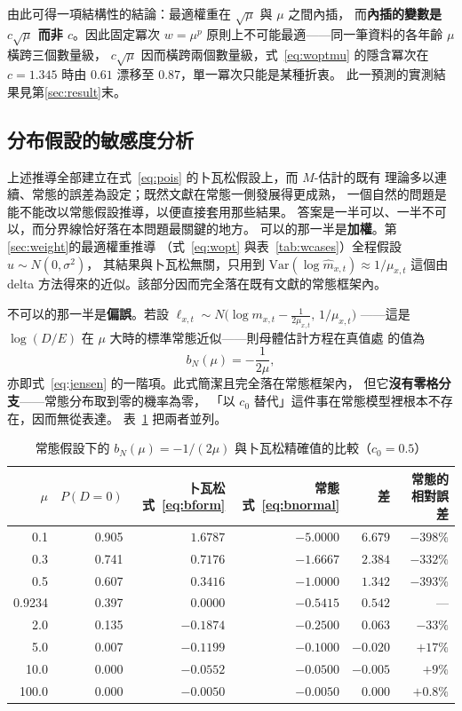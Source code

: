 \documentclass[UTF8, fontset=macnew, a4paper, 12pt]{ctexart}
\begin{document}
由此可得一項結構性的結論：最適權重在 $\sqrt{\mu}$ 與 $\mu$ 之間內插，
而\textbf{內插的變數是 $c\sqrt{\mu}$ 而非 $c$}。因此固定冪次 $w=\mu^{p}$
原則上不可能最適——同一筆資料的各年齡 $\mu$ 橫跨三個數量級，
$c\sqrt{\mu}$ 因而橫跨兩個數量級，式~\eqref{eq:woptmu} 的隱含冪次在
$c=1.345$ 時由 $0.61$ 漂移至 $0.87$，單一冪次只能是某種折衷。
此一預測的實測結果見第\ref{sec:result}末。

\subsection{分布假設的敏感度分析}\label{sec:normal}

上述推導全部建立在式~\eqref{eq:pois} 的卜瓦松假設上，而 $M$-估計的既有
理論多以連續、常態的誤差為設定；既然文獻在常態一側發展得更成熟，
一個自然的問題是能不能改以常態假設推導，以便直接套用那些結果。
答案是一半可以、一半不可以，而分界線恰好落在本問題最關鍵的地方。
可以的那一半是\textbf{加權}。第\ref{sec:weight}的最適權重推導
（式~\eqref{eq:wopt} 與表~\ref{tab:wcases}）全程假設 $u\sim N(0,\sigma^2)$，
其結果與卜瓦松無關，只用到 $\mathrm{Var}(\log\hat m_{x,t})\approx1/\mu_{x,t}$
這個由 delta 方法得來的近似。該部分因而完全落在既有文獻的常態框架內。

不可以的那一半是\textbf{偏誤}。若設
$\ell_{x,t}\sim N\!\big(\log m_{x,t}-\tfrac{1}{2\mu_{x,t}},\,1/\mu_{x,t}\big)$
——這是 $\log(D/E)$ 在 $\mu$ 大時的標準常態近似——則母體估計方程在真值處
的值為
\begin{equation}\label{eq:bnormal}
b_N(\mu)=-\frac{1}{2\mu},
\end{equation}
亦即式~\eqref{eq:jensen} 的一階項。此式簡潔且完全落在常態框架內，
但它\textbf{沒有零格分支}——常態分布取到零的機率為零，
「以 $c_0$ 替代」這件事在常態模型裡根本不存在，因而無從表達。
表~\ref{tab:normal} 把兩者並列。

\begin{table}[H]
\centering
\caption{常態假設下的 $b_N(\mu)=-1/(2\mu)$ 與卜瓦松精確值的比較（$c_0=0.5$）}
\small
\begin{tabular}{rrrrrr}
\toprule
$\mu$ & $P(D=0)$ & 卜瓦松 式~\eqref{eq:bform} & 常態 式~\eqref{eq:bnormal}
 & 差 & 常態的相對誤差\\
\midrule
0.1   & 0.905 & $1.6787$  & $-5.0000$ & $6.679$  & $-398\%$\\
0.3   & 0.741 & $0.7176$  & $-1.6667$ & $2.384$  & $-332\%$\\
0.5   & 0.607 & $0.3416$  & $-1.0000$ & $1.342$  & $-393\%$\\
0.9234& 0.397 & $0.0000$  & $-0.5415$ & $0.542$  & ---\\
2.0   & 0.135 & $-0.1874$ & $-0.2500$ & $0.063$  & $-33\%$\\
5.0   & 0.007 & $-0.1199$ & $-0.1000$ & $-0.020$ & $+17\%$\\
10.0  & 0.000 & $-0.0552$ & $-0.0500$ & $-0.005$ & $+9\%$\\
100.0 & 0.000 & $-0.0050$ & $-0.0050$ & $0.000$  & $+0.8\%$\\
\bottomrule
\end{tabular}
\label{tab:normal}
\end{table}
\end{document}
